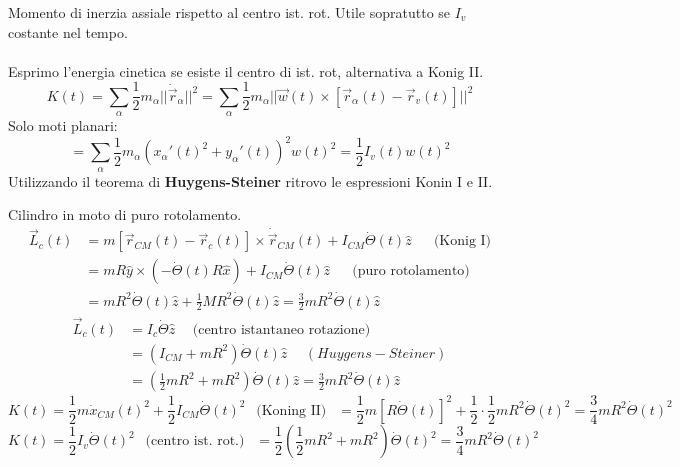 Momento di inerzia assiale rispetto al centro ist. rot. Utile sopratutto se $I_v$ costante nel tempo.\\\\
Esprimo l'energia cinetica se esiste il centro di ist. rot, alternativa a Konig II.
$$K(t) = \sum_{\alpha}\frac{1}{2}m_{\alpha}||\dot{\vec{r}}_{\alpha}||^2 = \sum_{\alpha}\frac{1}{2}m_{\alpha}||\vec{w}(t) \times [\vec{r}_{\alpha}(t) - \vec{r}_v(t)]||^2$$
Solo moti planari:
$$= \sum_{\alpha}\frac{1}{2}m_{\alpha}(x_{\alpha}'(t)^2 + y_{\alpha}'(t))^2 w(t)^2 = \frac{1}{2}I_v(t)w(t)^2$$
Utilizzando il teorema di \textbf{Huygens-Steiner} ritrovo le espressioni Konin I e II.
\begin{example}
    Cilindro in moto di puro rotolamento.
    \begin{equation*}
        \begin{split}
            \vec{L}_c(t) & = m[\vec{r}_{CM}(t) - \vec{r}_c(t)] \times \dot{\vec{r}}_{CM}(t) + I_{CM}\dot{\Theta}(t)\hat{z} \hspace{15pt}\text{ (Konig I)}\\
                         & = mR\hat{y} \times (-\dot{\Theta}(t)R \hat{x}) + I_{CM}\dot{\Theta}(t)\hat{z} \hspace{15pt}\text{ (puro rotolamento)}\\
                         & = mR^2\dot{\Theta}(t)\hat{z} + \frac{1}{2}MR^2\dot{\Theta}(t)\hat{z} = \frac{3}{2}mR^2\dot{\Theta}(t)\hat{z}
        \end{split}
    \end{equation*}
    \begin{equation*}
        \begin{split}
            \vec{L}_c(t) & = I_c\dot{\Theta}\hat{z} \hspace{15pt}\text{(centro istantaneo rotazione)}\\
                         & = (I_{CM} + mR^2) \dot{\Theta}(t)\hat{z} \hspace{15pt} (Huygens-Steiner)\\
                         & = (\frac{1}{2}mR^2 + mR^2)\dot{\Theta}(t)\hat{z} = \frac{3}{2}mR^2\dot{\Theta}(t)\hat{z}
        \end{split}
    \end{equation*}
    $$K(t) = \frac{1}{2}m\dot{x}_{CM}(t)^2 + \frac{1}{2}I_{CM}\dot{\Theta}(t)^2 \:\:\text{ (Koning II) }\:\: = \frac{1}{2}m[R\dot{\Theta}(t)]^2 + \frac{1}{2} \cdot \frac{1}{2}mR^2\dot{\Theta}(t)^2 = \frac{3}{4}mR^2\dot{\Theta}(t)^2$$
    $$K(t) = \frac{1}{2}I_v\dot{\Theta}(t)^2 \:\:\text{ (centro ist. rot.) }\:\: = \frac{1}{2}(\frac{1}{2}mR^2 + mR^2)\dot{\Theta}(t)^2 = \frac{3}{4}mR^2\dot{\Theta}(t)^2$$
\end{example}

